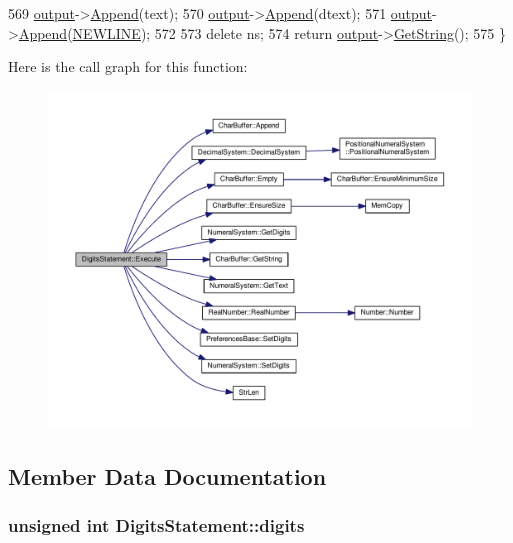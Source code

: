 \begin{DoxyCode}
569     \hyperlink{classSyntaxNode_a1180628cbe3fce43930cee0df5a9ce5c}{output}->\hyperlink{classCharBuffer_a045b38735f7b3007c1b98d3d7b7feafe}{Append}(text);
570     \hyperlink{classSyntaxNode_a1180628cbe3fce43930cee0df5a9ce5c}{output}->\hyperlink{classCharBuffer_a045b38735f7b3007c1b98d3d7b7feafe}{Append}(dtext);
571     \hyperlink{classSyntaxNode_a1180628cbe3fce43930cee0df5a9ce5c}{output}->\hyperlink{classCharBuffer_a045b38735f7b3007c1b98d3d7b7feafe}{Append}(\hyperlink{platform_8h_a806511f4930171733227c99101dc0606}{NEWLINE});
572 
573     \textcolor{keyword}{delete} ns;
574     \textcolor{keywordflow}{return} \hyperlink{classSyntaxNode_a1180628cbe3fce43930cee0df5a9ce5c}{output}->\hyperlink{classCharBuffer_a7dfd3feaaf80f318ba44efe15b1ec44b}{GetString}();
575 \}
\end{DoxyCode}


Here is the call graph for this function\+:\nopagebreak
\begin{figure}[H]
\begin{center}
\leavevmode
\includegraphics[width=350pt]{classDigitsStatement_a5a16b621b4759cdc0bf980b01858350b_cgraph}
\end{center}
\end{figure}




\subsection{Member Data Documentation}
\subsubsection[{\texorpdfstring{digits}{digits}}]{\setlength{\rightskip}{0pt plus 5cm}unsigned int Digits\+Statement\+::digits\hspace{0.3cm}{\ttfamily [private]}}\hypertarget{classDigitsStatement_a9d71ae96bc7bcd432deb9e4700e89550}{}\label{classDigitsStatement_a9d71ae96bc7bcd432deb9e4700e89550}


